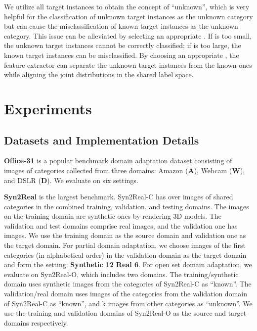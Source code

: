 \documentclass[letterpaper]{article} \usepackage{aaai20}  \usepackage{times}  \usepackage{helvet} \usepackage{courier}  \usepackage[hyphens]{url}  \usepackage{graphicx} \urlstyle{rm} \def\UrlFont{\rm}  \usepackage{graphicx}  \frenchspacing  \setlength{\pdfpagewidth}{8.5in}  \setlength{\pdfpageheight}{11in}
\begin{document}
We utilize all target instances to obtain the concept of ``unknown'', which is very helpful for the classification of unknown target instances as the unknown category but can cause the misclassification of known target instances as the unknown category. This issue can be alleviated by selecting an appropriate . If  is too small, the unknown target instances cannot be correctly classified; if  is too large, the known target instances can be misclassified. By choosing an appropriate , the feature extractor can separate the unknown target instances from the known ones while aligning the joint distributions in the shared label space.

\section{Experiments}

\subsection{Datasets and Implementation Details}
\noindent\textbf{Office-31} \cite{office31} is a popular benchmark domain adaptation dataset consisting of  images of  categories collected from three domains: Amazon (\textbf{A}), Webcam (\textbf{W}), and DSLR (\textbf{D}). We evaluate on six settings.

\noindent\textbf{Syn2Real} \cite{visda} is the largest benchmark. Syn2Real-C has over  images of  shared categories in the combined training, validation, and testing domains. The  images on the training domain are synthetic ones by rendering 3D models. The validation and test domains comprise real images, and the validation one has  images. We use the training domain as the source domain and validation one as the target domain. For partial domain adaptation, we choose images of the first  categories (in alphabetical order) in the validation domain as the target domain and form the setting: \textbf{Synthetic 12}  \textbf{Real 6}. For open set domain adaptation, we evaluate on Syn2Real-O, which includes two domains. The training/synthetic domain uses synthetic images from the  categories of Syn2Real-C as ``known''. The validation/real domain uses images of the  categories from the validation domain of Syn2Real-C as ``known'', and k images from  other categories as ``unknown''. We use the training and validation domains of Syn2Real-O as the source and target domains respectively. 
\end{document}
